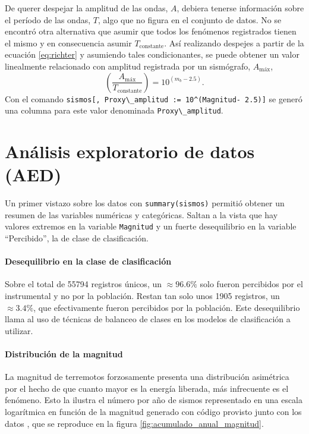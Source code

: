 \documentclass[a4paper]{report}
\begin{document}
De querer despejar la amplitud de las ondas, \(A\), debiera tenerse información sobre el período de las ondas, \(T\), algo que no figura en el conjunto de datos.
No se encontró otra alternativa que asumir que todos los fenómenos registrados tienen el mismo y en consecuencia asumir \(T_\text{constante}\).
Así realizando despejes a partir de la ecuación \ref{eq:richter} y asumiendo tales condicionantes, se puede obtener un valor linealmente relacionado con amplitud registrada por un sismógrafo, \(A_\text{máx}\),
\begin{equation}
	\left( \frac{A_\text{máx}}{T_\text{constante}} \right) = 10^{(m_b - 2.5)}.
	\label{eq:linealizacionMagnitud_final} 
\end{equation}
Con el comando \verb'sismos[, Proxy\_amplitud := 10^(Magnitud- 2.5)]' se generó una columna para este valor denominada \verb'Proxy\_amplitud'.



\section{Análisis exploratorio de datos (AED)}\label{sec:AED}

Un primer vistazo sobre los datos con \verb'summary(sismos)' permitió obtener un resumen de las variables numéricas y categóricas.
Saltan a la vista que hay valores extremos en la variable \verb'Magnitud' y un fuerte desequilibrio en la variable ``Percibido'', la de clase de clasificación.


\paragraph{Desequilibrio en la clase de clasificación}
Sobre el total de 55794 registros únicos, un \(\approx 96.6\%\) solo fueron percibidos por el instrumental y no por la población.
Restan tan solo unos 1905 registros, un \(\approx 3.4\%\), que efectivamente fueron percibidos por la población.
Este desequilibrio llama al uso de técnicas de balanceo de clases en los modelos de clasificación a utilizar.


\paragraph{Distribución de la magnitud}
La magnitud de terremotos forzosamente presenta una distribución asimétrica por el hecho de que cuanto mayor es la energía liberada, más infrecuente es el fenómeno.
Esto la ilustra el número por año de sismos representado en una escala logarítmica en función de la magnitud generado con código provisto junto con los datos \cite[sección 4.2.1]{daniela_parada_ic-datasets-docencia_nodate}, que se reproduce en la figura \ref{fig:acumulado_anual_magnitud}.
\end{document}
